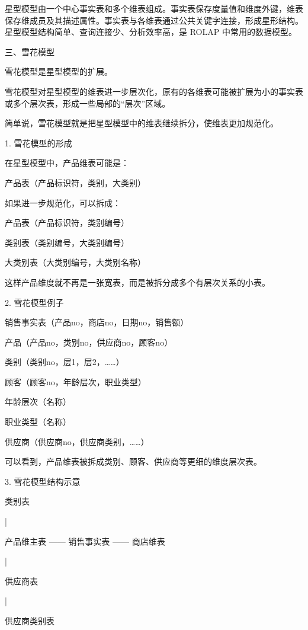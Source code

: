 \documentclass[UTF8,zihao=-4]{ctexart}
\begin{document}
星型模型由一个中心事实表和多个维表组成。事实表保存度量值和维度外键，维表保存维成员及其描述属性。事实表与各维表通过公共关键字连接，形成星形结构。星型模型结构简单、查询连接少、分析效率高，是 ROLAP 中常用的数据模型。\par

三、雪花模型\par

雪花模型是星型模型的扩展。\par

雪花模型对星型模型的维表进一步层次化，原有的各维表可能被扩展为小的事实表或多个层次表，形成一些局部的“层次”区域。\par

简单说，雪花模型就是把星型模型中的维表继续拆分，使维表更加规范化。\par

1. 雪花模型的形成\par

在星型模型中，产品维表可能是：\par

产品表（产品标识符，类别，大类别）\par

如果进一步规范化，可以拆成：\par

产品表（产品标识符，类别编号）\par
类别表（类别编号，大类别编号）\par
大类别表（大类别编号，大类别名称）\par

这样产品维度就不再是一张宽表，而是被拆分成多个有层次关系的小表。\par

2. 雪花模型例子\par

销售事实表（产品no，商店no，日期no，销售额）\par

产品（产品no，类别no，供应商no，顾客no）\par
类别（类别no，层1，层2，……）\par
顾客（顾客no，年龄层次，职业类型）\par
年龄层次（名称）\par
职业类型（名称）\par
供应商（供应商no，供应商类别，……）\par

可以看到，产品维表被拆成类别、顾客、供应商等更细的维度层次表。\par

3. 雪花模型结构示意\par
\hspace*{1em}类别表\par
\hspace*{1em}|\par
产品维主表 —— 销售事实表 —— 商店维表\par
\hspace*{1em}|\par
\hspace*{1em}供应商表\par
\hspace*{1em}|\par
\hspace*{1em}供应商类别表\par
\end{document}
